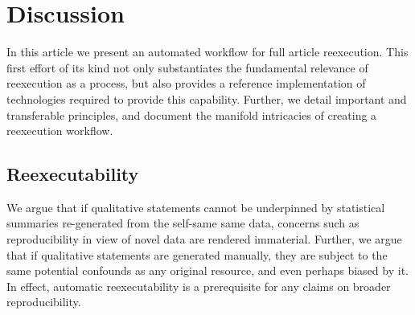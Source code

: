 \section{Discussion}



In this article we present an automated workflow for full article reexecution.
This first effort of its kind not only substantiates the fundamental relevance of reexecution as a process, but also provides a reference implementation of technologies required to provide this capability.
Further, we detail important and transferable principles, and document the manifold intricacies of creating a reexecution workflow.

\subsection{Reexecutability}
We argue that if qualitative statements cannot be underpinned by statistical summaries re-generated from the self-same same data, concerns such as reproducibility in view of novel data are rendered immaterial.
Further, we argue that if qualitative statements are generated manually, they are subject to the same potential confounds as any original resource, and even perhaps biased by it.
In effect, automatic reexecutability is a prerequisite for any claims on broader reproducibility.

